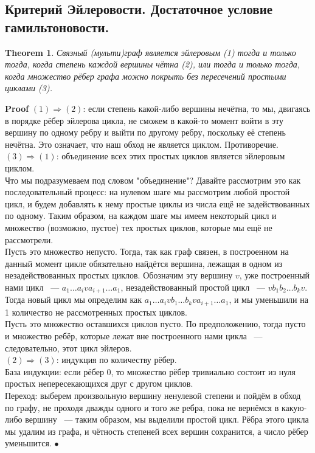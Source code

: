 \documentclass[a4paper]{article}
\theoremstyle{plain}
\newtheorem{theorem}{Theorem}
\theoremstyle{remark}
\theoremstyle{definition}
\renewenvironment{proof}{{\bfseries Proof}}{$\bullet$}
\begin{document}
\subsection{Критерий Эйлеровости. Достаточное условие гамильтоновости.}
\begin{theorem} Связный (мульти)граф является эйлеровым (1) тогда и только тогда, когда степень каждой вершины чётна (2), или тогда и только тогда, когда множество рёбер графа можно покрыть без пересечений простыми циклами (3).
\end{theorem}
\begin{proof} $(1)\Rightarrow(2)$: если степень какой-либо вершины нечётна, то мы, двигаясь в порядке рёбер эйлерова цикла, не сможем в какой-то момент войти в эту вершину по одному ребру и выйти по другому ребру, поскольку её степень нечётна. Это означает, что наш обход не является циклом. Противоречие.\\
$(3)\Rightarrow(1)$: объединение всех этих простых циклов является эйлеровым циклом.\\
Что мы подразумеваем под словом "объединение"? Давайте рассмотрим это как последовательный процесс: на нулевом шаге мы рассмотрим любой простой цикл, и будем добавлять к нему простые циклы из числа ещё не задействованных по одному. Таким образом, на каждом шаге мы имеем некоторый цикл и множество (возможно, пустое) тех простых циклов, которые мы ещё не рассмотрели.\\
Пусть это множество непусто. Тогда, так как граф связен, в построенном на данный момент цикле обязательно найдётся вершина, лежащая в одном из незадействованных простых циклов. Обозначим эту вершину $v$, уже построенный нами цикл ~--- $a_1\dots a_i v a_{i+1}\dots a_1$, незадействованный простой цикл ~--- $vb_1b_2\dots b_kv$. Тогда новый цикл мы определим как $a_1\dots a_i v b_1\dots b_k v a_{i+1}\dots a_1$, и мы уменьшили на 1 количество не рассмотренных простых циклов.\\
Пусть это множество оставшихся циклов пусто. По предположению, тогда пусто и множество ребёр, которые лежат вне построенного нами цикла ~--- следовательно, этот цикл эйлеров.\\
$(2)\Rightarrow(3)$: индукция по количеству рёбер.\\
База индукции: если рёбер $0$, то множество рёбер тривиально состоит из нуля простых непересекающихся друг с другом циклов.\\
Переход: выберем произвольную вершину ненулевой степени и пойдём в обход по графу, не проходя дважды одного и того же ребра, пока не вернёмся в какую-либо вершину ~--- таким образом, мы выделили простой цикл. Рёбра этого цикла мы удалим из графа, и чётность степеней всех вершин сохранится, а число рёбер уменьшится.
\end{proof}
\end{document}
